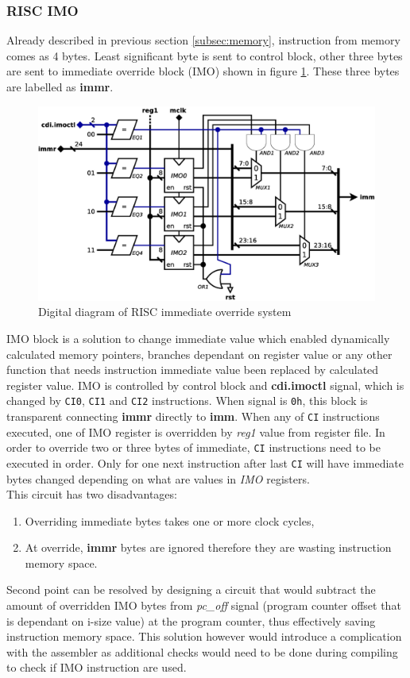 \subsubsection{RISC IMO} \label{subsec:imo}
Already described in previous section \ref{subsec:memory}, instruction from memory comes as 4 bytes. Least significant byte is sent to control block, other three bytes are sent to immediate override block (IMO) shown in figure \ref{fig:risc_imo}. These three bytes are labelled as \textbf{immr}. 

\begin{figure}
	\centering
	\includegraphics[scale=0.4]{../resources/risc_imo.eps}
	\caption{Digital diagram of RISC immediate override system}
	\label{fig:risc_imo}
\end{figure}


IMO block is a solution to change immediate value which enabled dynamically calculated memory pointers, branches dependant on register value or any other function that needs instruction immediate value been replaced by calculated register value. IMO is controlled by control block and \textbf{cdi.imoctl} signal, which is changed by \texttt{CI0}, \texttt{CI1} and \texttt{CI2} instructions. When signal is \texttt{0h}, this block is transparent connecting \textbf{immr} directly to \textbf{imm}. When any of \texttt{CI} instructions executed, one of IMO register is overridden by \textit{reg1} value from register file. In order to override two or three bytes of immediate, \texttt{CI} instructions need to be executed in order. Only for one next instruction after last \texttt{CI} will have immediate bytes changed depending on what are values in \textit{IMO} registers.
\\This circuit has two disadvantages: 
\begin{enumerate}
	\item Overriding immediate bytes takes one or more clock cycles,
	\item At override, \textbf{immr} bytes are ignored therefore they are wasting instruction memory space.
\end{enumerate}
Second point can be resolved by designing a circuit that would subtract the amount of overridden IMO bytes from \textit{pc\_off} signal (program counter offset that is dependant on i-size value) at the program counter, thus effectively saving instruction memory space. This solution however would introduce a complication with the assembler as additional checks would need to be done during compiling to check if IMO instruction are used.

